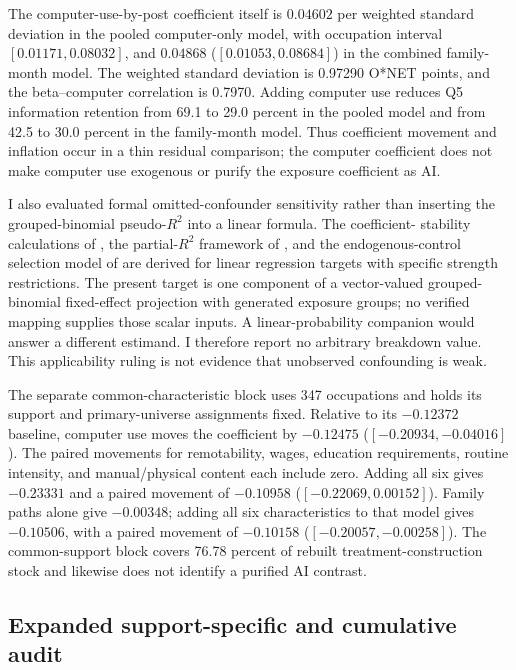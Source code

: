 The computer-use-by-post coefficient itself is $0.04602$ per weighted standard
deviation in the pooled computer-only model, with occupation interval
$[0.01171,0.08032]$, and $0.04868$ ($[0.01053,0.08684]$) in the combined
family-month model.  The weighted standard deviation is 0.97290 O*NET points,
and the beta--computer correlation is 0.7970.  Adding computer use reduces
Q5 information retention from 69.1 to 29.0 percent in the pooled model and
from 42.5 to 30.0 percent in the family-month model.  Thus coefficient
movement and inflation occur in a thin residual comparison; the computer
coefficient does not make computer use exogenous or purify the exposure
coefficient as AI.

I also evaluated formal omitted-confounder sensitivity rather than inserting
the grouped-binomial pseudo-$R^2$ into a linear formula.  The coefficient-
stability calculations of \citet{oster2019selection}, the partial-$R^2$
framework of \citet{cinelli2020sensitivity}, and the endogenous-control
selection model of \citet{diegert2022assessing} are derived for linear
regression targets with specific strength restrictions.  The present target is
one component of a vector-valued grouped-binomial fixed-effect projection with
generated exposure groups; no verified mapping supplies those scalar inputs.
A linear-probability companion would answer a different estimand.  I therefore
report no arbitrary breakdown value.  This applicability ruling is not
evidence that unobserved confounding is weak.

The separate common-characteristic block uses 347 occupations and holds its
support and primary-universe assignments fixed.  Relative to its $-0.12372$
baseline, computer use moves the coefficient by $-0.12475$
($[-0.20934,-0.04016]$).  The paired movements for remotability, wages,
education requirements, routine intensity, and manual/physical content each
include zero.  Adding all six gives $-0.23331$ and a paired movement of
$-0.10958$ ($[-0.22069,0.00152]$).  Family paths alone give $-0.00348$;
adding all six characteristics to that model gives $-0.10506$, with a paired
movement of $-0.10158$ ($[-0.20057,-0.00258]$).  The common-support block
covers 76.78 percent of rebuilt treatment-construction stock and likewise
does not identify a purified AI contrast.

\subsection{Expanded support-specific and cumulative audit}

